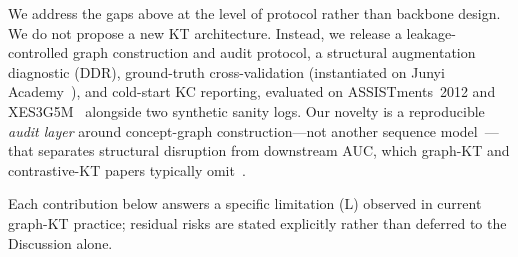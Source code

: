\documentclass[pdflatex,sn-mathphys-num]{sn-jnl}
\newcommand{\DDR}{\textsc{DDR}}
\begin{document}
We address the gaps above at the level of protocol rather than backbone
design. We do not propose a new KT architecture. Instead, we release a
leakage-controlled graph construction and audit protocol, a structural
augmentation diagnostic (\DDR{}), ground-truth cross-validation
(instantiated on Junyi Academy~\cite{junyi_dataset,chang2015junyi}),
and cold-start KC reporting, evaluated on ASSISTments~2012 and
XES3G5M~\cite{xes3g5m2023} alongside two synthetic sanity logs. Our
novelty is a reproducible \emph{audit layer} around concept-graph
construction---not another sequence model~\cite{abdelrahman2023kt_survey,liu2022pykt}---that
separates structural disruption from downstream AUC, which graph-KT and
contrastive-KT papers typically omit~\cite{nakagawa2019gkt,lee2022cl4kt}.

Each contribution below answers a specific limitation (L) observed in
current graph-KT practice; residual risks are stated explicitly rather
than deferred to the Discussion alone.
\end{document}
